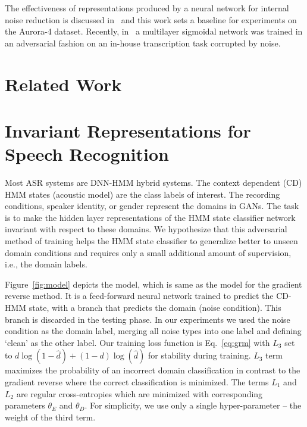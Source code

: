\documentclass[a4paper]{article}
\begin{document}
    The effectiveness of representations produced by a neural network for internal 
    noise reduction is discussed in~\cite{yu2013feature} and this work sets a 
    baseline for experiments on the Aurora-4 dataset. Recently, 
    in~\cite{yusuke2016adversarial} a multilayer sigmoidal network was trained 
    in an adversarial fashion on an in-house transcription task corrupted by noise.

\section{Related Work}
\label{sec:relatedwork}


\section{Invariant Representations for Speech Recognition}
\label{sec:invariant-speech}

Most ASR systems are DNN-HMM hybrid systems. The context dependent (CD) HMM 
states (acoustic model) are the class labels of interest. The
recording conditions, speaker identity, or gender represent the domains in 
GANs. The task is to make the hidden layer representations of the HMM state classifier network 
invariant with respect to these domains. We hypothesize that this adversarial method of
training helps the HMM state classifier to generalize better to unseen domain conditions and requires only a  
small additional amount of supervision, i.e., the domain labels.  

Figure~\ref{fig:model} depicts the model, which is same as the model for the 
gradient reverse method. It is a feed-forward neural network trained to predict 
the CD-HMM state, with a branch that predicts the domain (noise condition). This 
branch is discarded in the testing phase. In our experiments we
used the noise condition as the domain label, merging all noise types into one label
and defining `clean' as the other label. Our training loss function is Eq.~\ref{eq:grm} with 
$L_3$ set to $d\log(1 - \hat{d}) + (1-d)\log(\hat{d})$ for stability during training. 
$L_3$ term maximizes the probability
of an incorrect domain classification in contrast to the gradient reverse where the 
correct classification is minimized.
The terms $L_1$ and $L_2$ are 
regular cross-entropies which are minimized with corresponding parameters $\theta_E$ and $\theta_D$.
For simplicity, we use only a single hyper-parameter -- the weight of the third term.
\end{document}
